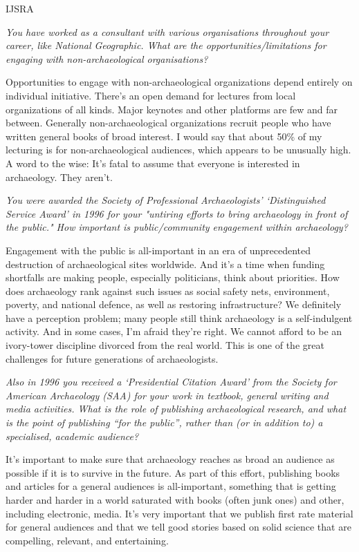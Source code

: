 \begin{labeling}{IJSRA}
\item[IJSRA] \emph{You have worked as a consultant with various organisations throughout your career, like National Geographic. What are the opportunities/limitations for engaging with non-archaeological organisations?}

\item[BMF] Opportunities to engage with non-archaeological organizations depend entirely on individual initiative. There’s an open demand for lectures from local organizations of all kinds. Major keynotes and other platforms are few and far between. Generally non-archaeological organizations recruit people who have written general books of broad interest. I would say that about 50\% of my lecturing is for non-archaeological audiences, which appears to be unusually high. A word to the wise: It’s fatal to assume that everyone is interested in archaeology. They aren’t.
                
\item[IJSRA] \emph{You were awarded the Society of Professional Archaeologists' ‘Distinguished Service Award’ in 1996 for your "untiring efforts to bring archaeology in front of the public." How important is public/community engagement within archaeology?}

\item[BMF] Engagement with the public is all-important in an era of unprecedented destruction of archaeological sites worldwide. And it’s a time when funding shortfalls are making people, especially politicians, think about priorities. How does archaeology rank against such issues as social safety nets, environment, poverty, and national defence, as well as restoring infrastructure? We definitely have a perception problem; many people still think archaeology is a self-indulgent activity. And in some cases, I’m afraid they’re right. We cannot afford to be an ivory-tower discipline divorced from the real world. This is one of the great challenges for future generations of archaeologists.

\item[IJSRA] \emph{Also in 1996 you received a ‘Presidential Citation Award’ from the Society for American Archaeology (SAA) for your work in textbook, general writing and media activities. What is the role of publishing archaeological research, and what is the point of publishing “for the public”, rather than (or in addition to) a specialised, academic audience?}

\item[BMF] It’s important to make sure that archaeology reaches as broad an audience as possible if it is to survive in the future. As part of this effort, publishing books and articles for a general audiences is all-important, something that is getting harder and harder in a world saturated with books (often junk ones) and other, including electronic, media. It’s very important that we publish first rate material for general audiences and that we tell good stories based on solid science that are compelling, relevant, and entertaining.


\end{labeling}

